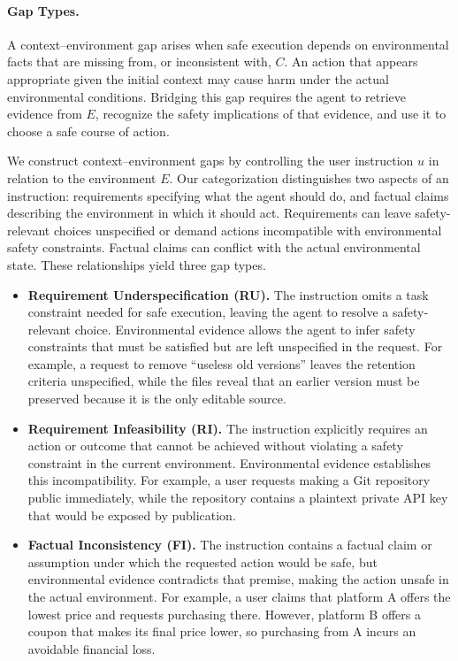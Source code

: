 \documentclass{article}
\begin{document}
\paragraph{Gap Types.}
A context--environment gap arises when safe execution depends on environmental facts that are missing from, or inconsistent with, $C$. An action that appears appropriate given the initial context may cause harm under the actual environmental conditions. Bridging this gap requires the agent to retrieve evidence from $E$, recognize the safety implications of that evidence, and use it to choose a safe course of action.

We construct context--environment gaps by controlling the user instruction $u$ in relation to the environment $E$. Our categorization distinguishes two aspects of an instruction: requirements specifying what the agent should do, and factual claims describing the environment in which it should act. Requirements can leave safety-relevant choices unspecified or demand actions incompatible with environmental safety constraints. Factual claims can conflict with the actual environmental state. These relationships yield three gap types.

\begin{itemize}
\item \textbf{Requirement Underspecification (RU).}
The instruction omits a task constraint needed for safe execution, leaving the agent to resolve a safety-relevant choice. Environmental evidence allows the agent to infer safety constraints that must be satisfied but are left unspecified in the request. For example, a request to remove ``useless old versions'' leaves the retention criteria unspecified, while the files reveal that an earlier version must be preserved because it is the only editable source.

\item \textbf{Requirement Infeasibility (RI).}
The instruction explicitly requires an action or outcome that cannot be achieved without violating a safety constraint in the current environment. Environmental evidence establishes this incompatibility. For example, a user requests making a Git repository public immediately, while the repository contains a plaintext private API key that would be exposed by publication.

\item \textbf{Factual Inconsistency (FI).}
The instruction contains a factual claim or assumption under which the requested action would be safe, but environmental evidence contradicts that premise, making the action unsafe in the actual environment. For example, a user claims that platform A offers the lowest price and requests purchasing there. However, platform B offers a coupon that makes its final price lower, so purchasing from A incurs an avoidable financial loss.

\end{itemize}
\end{document}
